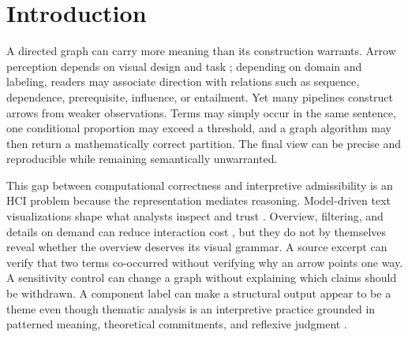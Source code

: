 \documentclass[manuscript,screen,review]{acmart}
\begin{document}



\maketitle

\begingroup
\renewcommand\thefootnote{}
\endgroup

\section{Introduction}

A directed graph can carry more meaning than its construction warrants. Arrow perception depends on visual design and task \cite{holten2009}; depending on domain and labeling, readers may associate direction with relations such as sequence, dependence, prerequisite, influence, or entailment. Yet many pipelines construct arrows from weaker observations. Terms may simply occur in the same sentence, one conditional proportion may exceed a threshold, and a graph algorithm may then return a mathematically correct partition. The final view can be precise and reproducible while remaining semantically unwarranted.

This gap between computational correctness and interpretive admissibility is an HCI problem because the representation mediates reasoning. Model-driven text visualizations shape what analysts inspect and trust \cite{chuang2012}. Overview, filtering, and details on demand can reduce interaction cost \cite{shneiderman1996}, but they do not by themselves reveal whether the overview deserves its visual grammar. A source excerpt can verify that two terms co-occurred without verifying why an arrow points one way. A sensitivity control can change a graph without explaining which claims should be withdrawn. A component label can make a structural output appear to be a theme even though thematic analysis is an interpretive practice grounded in patterned meaning, theoretical commitments, and reflexive judgment \cite{braun2006,braun2021}.
\end{document}
